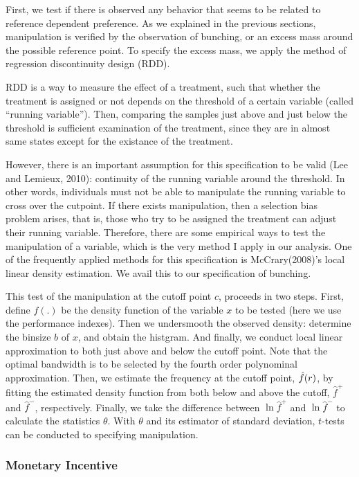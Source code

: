 \documentclass[dvipdfmx, 12pt]{article}
\begin{document}
  First, we test if there is observed any behavior that seems to be related to reference dependent preference. As we explained in the previous sections, manipulation is verified by the observation of bunching, or an excess mass around the possible reference point. To specify the excess mass, we apply the method of regression discontinuity design (RDD).

  RDD is a way to measure the effect of a treatment, such that whether the treatment is assigned or not depends on the threshold of a certain variable (called ``running variable''). Then, comparing the samples just above and just below the threshold is sufficient examination of the treatment, since they are in almost same states except for the existance of the treatment.

  However, there is an important assumption for this specification to be valid (Lee and Lemieux, 2010): continuity of the running variable around the threshold. In other words, individuals must not be able to manipulate the running variable to cross over the cutpoint. If there exists manipulation, then a selection bias problem arises, that is, those who try to be assigned the treatment can adjust their running variable. Therefore, there are some empirical ways to test the manipulation of a variable, which is the very method I apply in our analysis. One of the frequently applied methods for this specification is  McCrary(2008)'s local linear density estimation. We avail this to our specification of bunching.

  This test of the manipulation at the cutoff point $c$, proceeds in two steps. First, define $f(.)$ be the density function of the variable $x$ to be tested (here we use the performance indexes). Then we undersmooth the observed density: determine the binsize $b$ of $x$, and obtain the histgram. And finally, we conduct local linear approximation to both just above and below the cutoff point. Note that the optimal bandwidth is to be selected by the fourth order polynominal approximation. Then, we estimate the frequency at the cutoff point, $\Hat{f}(r)$, by fitting the estimated density function from both below and above the cutoff, $\hat{f}^+$ and $\hat{f}^-$, respectively. Finally, we take the difference between $\ln \hat{f}^+$ and $\ln \hat{f}^-$ to calculate the statistics $\theta$. With $\theta$ and its estimator of standard deviation, $t$-tests can be conducted to specifying manipulation.

  \subsubsection{Monetary Incentive}
\end{document}
